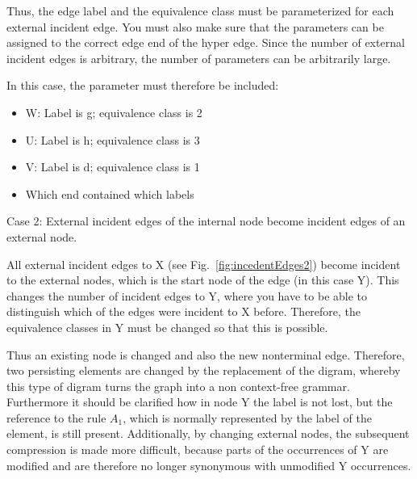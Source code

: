 Thus, the edge label and the equivalence class must be parameterized for each external incident edge. You must also make sure that the parameters can be assigned to the correct edge end of the hyper edge. Since the number of external incident edges is arbitrary, the number of parameters can be arbitrarily large. 

In this case, the parameter must therefore be included:
\begin{itemize}
	\item W: Label is g; equivalence class is 2
	\item U: Label is h; equivalence class is 3
	\item V: Label is d; equivalence class is 1
	\item Which end contained which labels
\end{itemize}


Case 2: External incident edges of the internal node become incident edges of an external node. 

All external incident edges to X (see Fig.~\ref{fig:incedentEdges2}) become incident to the external nodes, which is the start node of the edge (in this case Y). This changes the number of incident edges to Y, where you have to be able to distinguish which of the edges were incident to X before. Therefore, the equivalence classes in Y must be changed so that this is possible.

Thus an existing node is changed and also the new nonterminal edge. Therefore, two persisting elements are changed by the replacement of the digram, whereby this type of digram turns the graph into a non context-free grammar. Furthermore it should be clarified how in node Y the label is not lost, but the reference to the rule $A_1$, which is normally represented by the label of the element, is still present. Additionally, by changing external nodes, the subsequent compression is made more difficult, because parts of the occurrences of Y are modified and are therefore no longer synonymous with unmodified Y occurrences.

